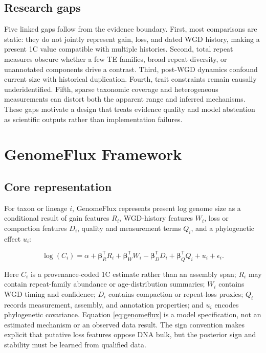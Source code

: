 \documentclass[conference]{IEEEtran}
\newcommand{\gf}{GenomeFlux}
\begin{document}
\subsection{Research gaps}

Five linked gaps follow from the evidence boundary. First, most comparisons are static: they do not jointly represent gain, loss, and dated WGD history, making a present 1C value compatible with multiple histories. Second, total repeat measures obscure whether a few TE families, broad repeat diversity, or unannotated components drive a contrast. Third, post-WGD dynamics confound current size with historical duplication. Fourth, trait constraints remain causally underidentified. Fifth, sparse taxonomic coverage and heterogeneous measurements can distort both the apparent range and inferred mechanisms. These gaps motivate a design that treats evidence quality and model abstention as scientific outputs rather than implementation failures.

\section{GenomeFlux Framework}

\subsection{Core representation}

For taxon or lineage $i$, \gf{} represents present log genome size as a conditional result of gain features $R_i$, WGD-history features $W_i$, loss or compaction features $D_i$, quality and measurement terms $Q_i$, and a phylogenetic effect $u_i$:

\begin{equation}
\log(C_i) = \alpha + \boldsymbol{\beta}_R^{\mathsf{T}}R_i + \boldsymbol{\beta}_W^{\mathsf{T}}W_i - \boldsymbol{\beta}_D^{\mathsf{T}}D_i + \boldsymbol{\beta}_Q^{\mathsf{T}}Q_i + u_i + \epsilon_i .
\label{eq:genomeflux}
\end{equation}

Here $C_i$ is a provenance-coded 1C estimate rather than an assembly span; $R_i$ may contain repeat-family abundance or age-distribution summaries; $W_i$ contains WGD timing and confidence; $D_i$ contains compaction or repeat-loss proxies; $Q_i$ records measurement, assembly, and annotation properties; and $u_i$ encodes phylogenetic covariance. Equation \eqref{eq:genomeflux} is a model specification, not an estimated mechanism or an observed data result. The sign convention makes explicit that putative loss features oppose DNA bulk, but the posterior sign and stability must be learned from qualified data.
\end{document}
